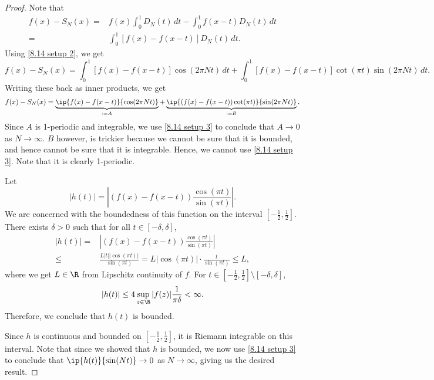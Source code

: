 \begin{proof}
    Note that
    \begin{align*} 
        f(x)-S_N(x)=&f(x)\int_0^1 D_N(t) \, dt - \int_0^1 f(x-t)D_N(t) \, dt\\
                   =&\int_0^1 [f(x)-f(x-t)]D_N(t) \, dt.
    \end{align*}
    Using \cref{8.14 setup 2}, we get 
    \begin{equation*} 
        f(x)-S_N(x)=\int_0^1 [f(x)-f(x-t)]\cos(2\pi Nt) \, dt+\int_0^1 [f(x)-f(x-t)]\cot(\pi t)\sin(2\pi Nt)\, dt.
    \end{equation*}
    Writing these back as inner products, we get
    \begin{equation*} 
        f(x)-S_N(x)=\underbrace{\ip{f(x)-f(x-t)}{\cos(2\pi Nt)}}_{:=A}+\underbrace{\ip{\left(f(x)-f(x-t)\right)\cot(\pi t)}{\sin(2\pi Nt)}}_{:=B}.
    \end{equation*}
    Since \(A\) is 1-periodic and integrable, we use \cref{8.14 setup 3} to conclude that \(A\to 0\) as \(N\to\infty\). \(B\) however, is trickier because we cannot be sure that it is bounded, and hence cannot be sure that it is integrable. Hence, we cannot use \cref{8.14 setup 3}. Note that it is clearly 1-periodic. 

    \medskip

    Let 
    \begin{equation*} 
        |h(t)|=\left|(f(x)-f(x-t))\frac{\cos(\pi t)}{\sin(\pi t)}\right|.
    \end{equation*}
    We are concerned with the boundedness of this function on the interval \(\displaystyle\left[-\frac{1}{2},\frac{1}{2}\right]\). There exists \(\delta>0\) such that for all \(t\in[-\delta,\delta]\), 
    \begin{align*} 
        |h(t)|=&\left|(f(x)-f(x-t))\frac{\cos(\pi t)}{\sin(\pi t)}\right|\\
           \leq&\frac{L|t||\cos(\pi t)|}{\sin(\pi t)}=L|\cos(\pi t)|\cdot\frac{t}{\sin(\pi t)}\leq L,
    \end{align*}
    where we get \(L\in\R\) from Lipschitz continuity of \(f\). For \(t\in\displaystyle\left[-\frac{1}{2},\frac{1}{2}\right]\setminus[-\delta,\delta]\),
    \begin{equation*} 
        |h(t)|\leq 4\sup_{z\in\R}|f(z)|\frac{1}{\pi\delta}<\infty.
    \end{equation*}
    Therefore, we conclude that \(h(t)\) is bounded.

    \smallskip

    Since \(h\) is continuous and bounded on \(\displaystyle\left[-\frac{1}{2},\frac{1}{2}\right]\), it is Riemann integrable on this interval. Note that since we showed that \(h\) is bounded, we now use \cref{8.14 setup 3} to conclude that \(\ip{h(t)}{\sin(Nt)}\to 0\) as \(N\to\infty\), giving us the desired result.
\end{proof}

